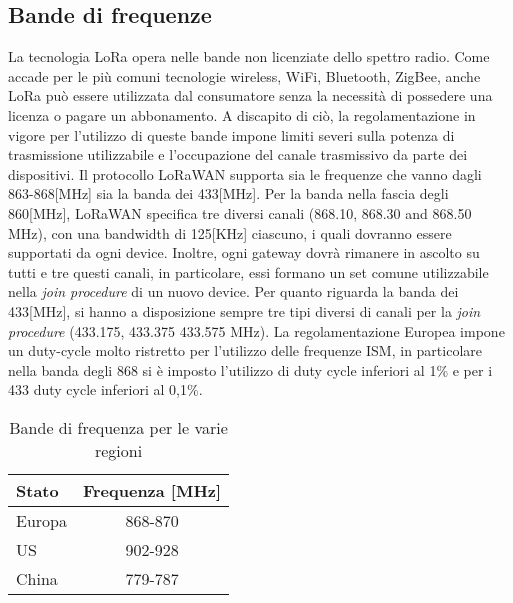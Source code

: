 \subsection{Bande di frequenze}
La tecnologia LoRa opera nelle bande non licenziate dello spettro radio.  Come
accade per le più comuni tecnologie wireless, WiFi, Bluetooth, ZigBee, anche LoRa
può essere utilizzata dal consumatore senza la necessità di possedere una
licenza o pagare un abbonamento.
A discapito di ciò, la regolamentazione in vigore per l'utilizzo di queste bande 
impone limiti severi sulla potenza di trasmissione utilizzabile e l'occupazione
del canale trasmissivo da parte dei dispositivi.
Il protocollo  LoRaWAN supporta sia le frequenze che vanno dagli
863-868[MHz] sia la banda dei 433[MHz]. Per la banda  nella fascia
degli 860[MHz], LoRaWAN specifica tre diversi canali (868.10, 868.30 and 868.50
MHz), con una bandwidth di 125[KHz] ciascuno, i quali dovranno essere supportati
da ogni device. Inoltre, ogni gateway dovrà
rimanere in ascolto su tutti e tre questi canali, in particolare, essi
formano un set comune utilizzabile nella \emph{join procedure} di un nuovo
device. Per
quanto riguarda la banda dei 433[MHz], si hanno a disposizione sempre tre tipi
diversi di canali per la \emph{join procedure} (433.175, 
433.375  433.575 MHz). 
La regolamentazione Europea impone un duty-cycle molto ristretto per l'utilizzo
delle frequenze ISM, in particolare nella banda degli 868 si è imposto
l'utilizzo di duty cycle inferiori al 1\% e per i 433 duty cycle inferiori al
0,1\%.
\begin{table}[ht]
        \centering
        \begin{tabular}{l|c}
                \toprule
                Stato   & Frequenza [MHz] \\
                \hline
                Europa  & 868-870 \\
                US      & 902-928 \\
                China   & 779-787 \\
                \bottomrule
        \end{tabular}
        \caption{Bande di frequenza per le varie regioni}
\end{table}

